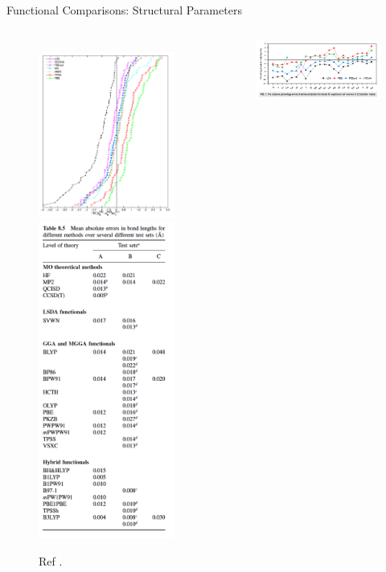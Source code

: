 \documentclass[aspectratio=169]{beamer}
\begin{document}
    \begin{frame}{Functional Comparisons: Structural Parameters}
        \begin{columns}
            \begin{figure}
                \includegraphics[width=0.55\linewidth]{lectures/figures/5_bond_lengths.png}
                \includegraphics[width=0.3\linewidth]{lectures/figures/6_bond_lengths.png}
                \caption{Ref \cite{haasCalculationLatticeConstant2009, cramerEssentialsComputationalChemistry2004}.}
            \end{figure}
            \begin{figure}
                \includegraphics[width=0.9\linewidth]{lectures/figures/6_equilibrium_vol.png}

\end{figure}
\end{columns}
\end{frame}
\end{document}
